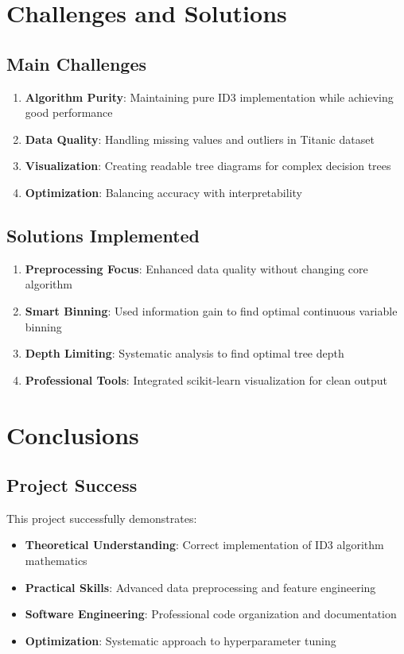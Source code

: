 \documentclass[12pt,a4paper]{article}
\begin{document}
\section{Challenges and Solutions}

\subsection{Main Challenges}
\begin{enumerate}
    \item \textbf{Algorithm Purity}: Maintaining pure ID3 implementation while achieving good performance
    \item \textbf{Data Quality}: Handling missing values and outliers in Titanic dataset
    \item \textbf{Visualization}: Creating readable tree diagrams for complex decision trees
    \item \textbf{Optimization}: Balancing accuracy with interpretability
\end{enumerate}

\subsection{Solutions Implemented}
\begin{enumerate}
    \item \textbf{Preprocessing Focus}: Enhanced data quality without changing core algorithm
    \item \textbf{Smart Binning}: Used information gain to find optimal continuous variable binning
    \item \textbf{Depth Limiting}: Systematic analysis to find optimal tree depth
    \item \textbf{Professional Tools}: Integrated scikit-learn visualization for clean output
\end{enumerate}

\section{Conclusions}

\subsection{Project Success}
This project successfully demonstrates:
\begin{itemize}
    \item \textbf{Theoretical Understanding}: Correct implementation of ID3 algorithm mathematics
    \item \textbf{Practical Skills}: Advanced data preprocessing and feature engineering
    \item \textbf{Software Engineering}: Professional code organization and documentation
    \item \textbf{Optimization}: Systematic approach to hyperparameter tuning
\end{itemize}
\end{document}
